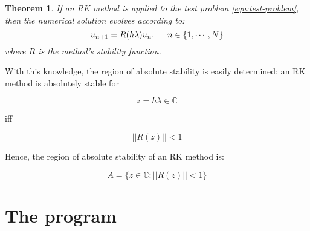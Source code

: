 \documentclass[11pt]{article}
\theoremstyle{theorem}
\newtheorem{theorem}{Theorem}
\theoremstyle{definition}
\begin{document}
\begin{theorem}
	\label{thhm:sol-evol-RK}
	If an RK method is applied to the test problem \eqref{eqn:test-problem}, then the numerical solution evolves according to:
	$$u_{n+1}=R(h\lambda)u_n,\hspace{5mm}n\in\lbrace1,\cdots,N\rbrace$$
	where $R$ is the method's stability function.\\
\end{theorem}

With this knowledge, the region of absolute stability is easily determined: an RK
method is absolutely stable for

$$ z=h\lambda\in\mathbb{C} $$

iff

$$||R(z)||<1$$

Hence, the region of absolute stability of an RK method is:

$$A=\lbrace z\in\mathbb{C}:||R(z)||<1\rbrace$$


\section{The program}
\end{document}
